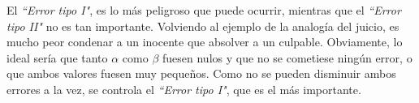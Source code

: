 El \textit{``Error tipo I"}, es lo más peligroso que puede ocurrir, mientras que el \textit{``Error tipo II"}
no es tan importante. Volviendo al ejemplo de la analogía del juicio, es mucho peor condenar a un inocente que
absolver a un culpable. Obviamente, lo ideal sería que tanto $\alpha$ como $\beta$ fuesen nulos y que no se
cometiese ningún error, o que ambos valores fuesen muy pequeños. Como no se pueden disminuir ambos errores a la
vez, se controla el \textit{``Error tipo I"}, que es el más importante.

